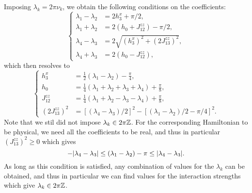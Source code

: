Imposing $\lambda_k=2\pi\nu_k$, we obtain the following conditions on the coefficients:
\begin{equation}
\begin{cases}
    \lambda_1 - \lambda_2 &= 2 h_3^x + \pi/2, \\
    \lambda_1 + \lambda_2 &= 2(h_0 + J_{12}^{zz}) - \pi/2, \\
    \lambda_4 - \lambda_3 &= 2\sqrt{(h_3^x)^2+ (2J_{13}^{zz})^2}, \\
    \lambda_4 + \lambda_3 &= 2(h_0 - J_{12}^{zz}),
\end{cases}
\label{eq:toffoli_lambdas_vs_parameters}
\end{equation}
which then resolves to
\begin{equation}
\begin{cases}%
    h_3^x &= \frac{1}{2}(\lambda_1 - \lambda_2) - \frac{\pi}{4}, \\
    h_0 &= \frac{1}{4}(\lambda_1 + \lambda_2 + \lambda_3 + \lambda_4) + \frac{\pi}{8}, \\
    J_{12}^{zz} &= \frac{1}{4}(\lambda_1 + \lambda_2 - \lambda_3 - \lambda_4) + \frac{\pi}{8}, \\
    (2J_{13}^{zz})^2 &=
    [(\lambda_4-\lambda_3)/2]^2 -
    [(\lambda_1-\lambda_2)/2 - \pi/4]^2.
\end{cases}
\end{equation}
Note that we stil did not impose $\lambda_k\in2\pi\mathbb{Z}$. For the corresponding Hamiltonian to be physical, we need all the coefficients to be real, and thus in particular $(J_{13}^{zz})^2\ge0$ which gives
\begin{equation}
    -\abs{\lambda_4 -\lambda_3} \le
    (\lambda_1 - \lambda_2) - \pi \le \abs{\lambda_4 -\lambda_3}.
    \label{eq:toffoli_lambdas_condition}
\end{equation}
As long as this condition is satisfied, any combination of values for the $\lambda_k$ can be obtained, and thus in particular we can find values for the interaction strengths which give $\lambda_k\in2\pi\mathbb{Z}$.

